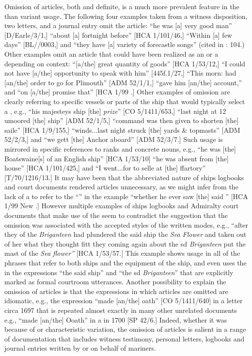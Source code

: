 Omission of articles, both  and definite, is a much more prevalent feature in the  than variant usage. The following four examples taken from a witness disposition, two letters, and a journal entry omit the  article: “he was [a] very good man” [D/Earle/3/1,] “about [a] fortnight before” [HCA 1/101/46,] “Within [a] few days” [BL/\citealt{Egerton2395}/0003,] and “they have [a] variety of forecastle songs” (cited in \citealt{Palmer1986}: 104.) Other examples omit an article that could have been realized as an  or a  depending on context: “[a/the] great quantity of goods” [HCA 1/53/12,] “I could not have [a/the] opportunity to speak with him” [445f.1/27,] “This morn: had [an/the] order to go for Plimouth” [ADM 52/1/1,] “gave him [an/the] account,” and “on [a/the] promise that” [HCA 1/99  \citealt{Islands1722}.] Other examples of omission are clearly referring to specific vessels or parts of the ship that would typically select a , e.g., “his majesteys ship [the] \textit{ prize}” [CO 5/1411/653,] “last night at 12 umoored [the] ship” [ADM 52/1/5,] “command was then given to shorten [the] saile” [HCA 1/9/155,] “winds...last night struck [the] yards \& topmasts” [ADM 52/2/3,] and “we gett [the] Anchor aboard” [ADM 52/3/7.] Such usage is mirrored in specific references to ranks and concrete nouns, e.g., “he was [the] Boatswaine[s]  of an English ship” [HCA 1/53/10] “he was absent from [the] house” [HCA 1/101/425,] and “I went...for to selle at [the] ffartory” [T/70/1216/13.] It may have been that the abbreviated nature of ships logbooks and court documents rendered articles unnecessary, as we might infer from the lack of a  to refer to the “” in the example “whether he ever saw [the] said ” [HCA 1/99 New \citealt{Providence1722}.] However multiple examples of ships logbooks and Admiralty court documents that make use of the  seem to contradict the suggestion that the omission was associated with the accepted styles of the written modes, e.g., “after they of the \textit{Briganteen} had plundered the said ship the \textit{Sea Flower} and taken out of her what they thought fitt they coming again about the sd \textit{Briganteen} put the mast of the \textit{Sea flower”} [HCA 1/53/57.] This example shows  usage in all of the phrases that refer to both ships and the equipment of the ship, and even uses the  in the expressions “the said ship” and “the sd \textit{Briganteen}” that are explicitly marked as formal courtroom utterances. Another possibility to explain the omission of articles is that the expressions in which articles are omitted are idiomatic, e.g., the expression “made [an/the] oath” [CO 5/1411/640] in a letter circa 1697 that is repeated almost exactly in many other unrelated documents e.g., “made [an/the] Ooath” in a  in 1700 [SP 42/6.] Indeed, whether it was because of  or characteristic variation, the omission of articles is salient in a range of documentation that includes witness testimony, personal letters, logbooks and journal entries written by or on behalf of mariners. 

